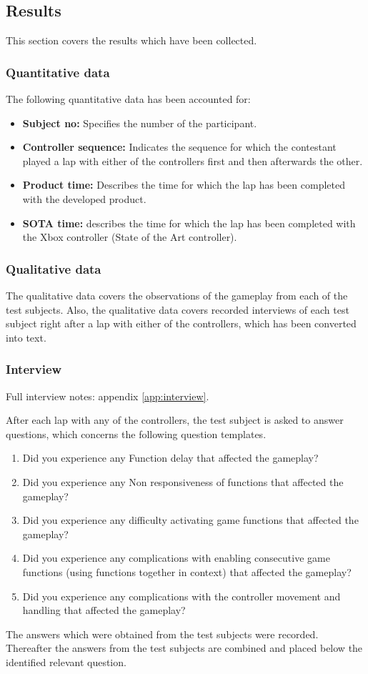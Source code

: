 \subsection{Results} \label{sec:results}
This section covers the results which have been collected.


\subsubsection{Quantitative data}
The following quantitative data has been accounted for:

\begin{itemize}
\item \textbf{Subject no:} Specifies the number of the participant.
\item \textbf{Controller sequence:} Indicates the sequence for which the contestant played a lap with either of the controllers first and then afterwards the other.
\item \textbf{Product time:} Describes the time for which the lap has been completed with the developed product.
\item \textbf{SOTA time:} describes the time for which the lap has been completed with the Xbox controller (State of the Art controller).
\end{itemize}




\subsubsection{Qualitative data}
The qualitative data covers the observations of the gameplay from each of the test subjects. 
Also, the qualitative data covers recorded interviews of each test subject right after a lap with either of the controllers, which has been converted into text.


\subsubsection{Interview}
Full interview notes: appendix \ref{app:interview}.

After each lap with any of the controllers, the test subject is asked to answer questions, which concerns the following question templates.

\begin{enumerate}
\item Did you experience any Function delay that affected the gameplay?
\item Did you experience any Non responsiveness of functions that affected the gameplay?
\item Did you experience any difficulty activating game functions that affected the gameplay?
\item Did you experience any complications with enabling consecutive game functions (using functions together in context) that affected the gameplay? 
\item Did you experience any complications with the controller movement and handling that affected the gameplay?
\end{enumerate}

The answers which were obtained from the test subjects were recorded. 
Thereafter the answers from the test subjects are combined and placed below the identified relevant question.